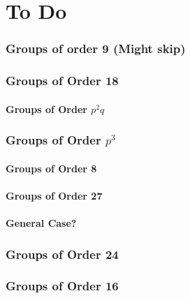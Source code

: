 \documentclass[a4paper, oneside, 12pt, final]{article}
\theoremstyle{definition}
\begin{document}

\part{To Do}


\section{Groups of order 9 (Might skip)}



\section{Groups of Order 18}
\subsection{Groups of Order \(p^2q\)}

\section{Groups of Order \(p^3\)}
\subsection{Groups of Order 8}
\subsection{Groups of Order 27}
\subsection{General Case?}

\section{Groups of Order 24}

\section{Groups of Order 16}
\end{document}
